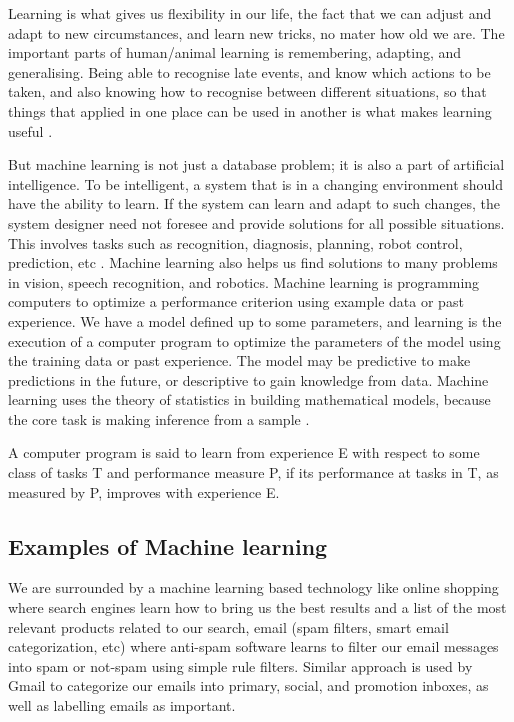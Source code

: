 Learning is what gives us flexibility
in our life, the fact that we can adjust and adapt to new circumstances, and learn new
tricks, no mater how old we are. The important parts of human/animal learning is remembering, adapting, and generalising. Being able to recognise late events, and know which actions to be taken, and also knowing how to recognise between different situations, so that things that applied in one place can be used in another is what makes learning useful \citep{marsland2015machine}. 

But machine learning is not just a database problem; it is also a part
of artificial intelligence. To be intelligent, a system that is in a changing
environment should have the ability to learn. If the system can learn and
adapt to such changes, the system designer need not foresee and provide
solutions for all possible situations. This involves tasks such as recognition, diagnosis,
planning, robot control, prediction, etc \citep{nilsson1996introduction}.
Machine learning also helps us find solutions to many problems in vision,
speech recognition, and robotics. Machine learning is programming computers to optimize a performance criterion using example data or past experience. We have a model defined
up to some parameters, and learning is the execution of a computer program
to optimize the parameters of the model using the training data or
past experience. The model may be predictive to make predictions in the
future, or descriptive to gain knowledge from data.
Machine learning uses the theory of statistics in building mathematical
models, because the core task is making inference from a sample \citep{alpaydin2014introduction}.


A computer program is said to learn from experience E with respect
to some class of tasks T and performance measure P, if its performance at tasks in
T, as measured by P, improves with experience E. 
\subsection{Examples of Machine learning}
We are surrounded by a machine learning based technology like online shopping where  search engines learn how to bring us the best results and a list of the most relevant products related to our search, email (spam filters, smart email categorization, etc)  where anti-spam software
learns to filter our email messages into spam or not-spam using simple rule filters. Similar approach is used by Gmail to categorize our emails into primary, social, and promotion inboxes, as well as labelling emails as important. 

